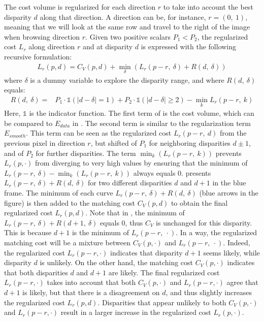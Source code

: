 The cost volume is regularized for each direction $r$ to take into account the best disparity $d$ along that direction. A direction can be, for instance, $r=(0,~1)$, meaning that we will look at the same row and travel to the right of the image when browsing direction $r$. Given two positive scalars $P_1<P_2$, the regularized cost $L_r$ along direction $r$ and at disparity $d$ is expressed with the following recursive formulation:
\begin{align}\label{eq:sgm}
    L_r(p,d) = C_V(p,d) + \min_\delta \left(L_r(p-r,~\delta) + R(d, ~\delta)\right)
\end{align}
where $\delta$ is a dummy variable to explore the disparity range, and where $R(d, ~\delta)$ equals:
\begin{align}
    R(d, ~\delta) = &P_1\cdot\mathds{1}(|d-\delta|=1) + P_2\cdot\mathds{1}(|d-\delta|\geqslant 2) - \min_k L_r(p-r,~k) \label{eq:sgm_penalties}
\end{align}
Here, $\mathds{1}$ is the indicator function. The first term of  is the cost volume, which can be compared to $E_{data}$ in . The second term is similar to the regularization term $E_{smooth}$. This term can be seen as the regularized cost $L_r(p-r, ~d)$ from the previous pixel in direction $r$, but shifted of $P_1$ for neighboring disparities $d\pm1$, and of $P_2$ for further disparities. The term $\min_k(L_r(p-r,~k))$ prevents $L_r(p,\cdot)$ from diverging to very high values by ensuring that the minimum of $L_r(p-r,~\delta) - \min_k(L_r(p-r,~k))$ always equals $0$.  presents $L_r(p-r,~\delta) + R(d, ~\delta)$ for two different disparities $d$ and $d+1$ in the blue frame. The minimum of each curve $L_r(p-r,~\delta) + R(d, ~\delta)$ (blue arrows in the figure) is then added to the matching cost $C_V(p,d)$ to obtain the final regularized cost $L_r(p,d)$. Note that in , the minimum of $L_r(p-r,~\delta)+R(d+1, ~\delta)$ equals $0$, thus $C_V$ is unchanged for this disparity. This is because $d+1$ is the minimum of $L_r(p-r,~\cdot)$. In a way, the regularized matching cost will be a mixture between $C_V(p,\cdot)$ and $L_r(p-r,~\cdot)$. Indeed, the regularized cost $L_r(p-r,\cdot)$ indicates that disparity $d+1$ seems likely, while disparity $d$ is unlikely. On the other hand, the matching cost $C_V(p,\cdot)$ indicates that both disparities $d$ and $d+1$ are likely. The final regularized cost $L_r(p-r,\cdot)$ takes into account that both $C_V(p,\cdot)$ and $L_r(p-r,\cdot)$ agree that $d+1$ is likely, but that there is a disagreement on $d$, and thus slightly increases the regularized cost $L_r(p,d)$. Disparities that appear unlikely to both $C_V(p,\cdot)$ and $L_r(p-r,\cdot)$ result in a larger increase in the regularized cost $L_r(p,\cdot)$.

